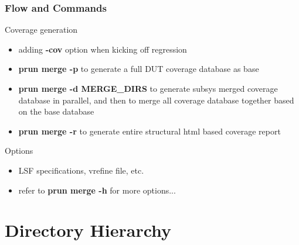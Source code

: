 \documentclass{beamer}
\begin{document}
\begin{frame}
  \frametitle{Flow and Commands}
  \begin{block}{Coverage generation}
    \begin{itemize}
    \item adding \textbf{-cov} option when kicking off regression
    \item \textbf{prun merge -p} to generate a full DUT coverage database as base
    \item \textbf{prun merge -d MERGE\_DIRS} to generate subsys merged coverage database in parallel, and then to merge all coverage database together based on the base database
    \item \textbf{prun merge -r} to generate entire structural html based coverage report
    \end{itemize}
  \end{block}

  \begin{block}{Options}
    \begin{itemize}
    \item LSF specifications, vrefine file, etc.
    \item refer to \textbf{prun merge -h} for more options...
    \end{itemize}
  \end{block}
\end{frame}

\section{Directory Hierarchy}
\end{document}

